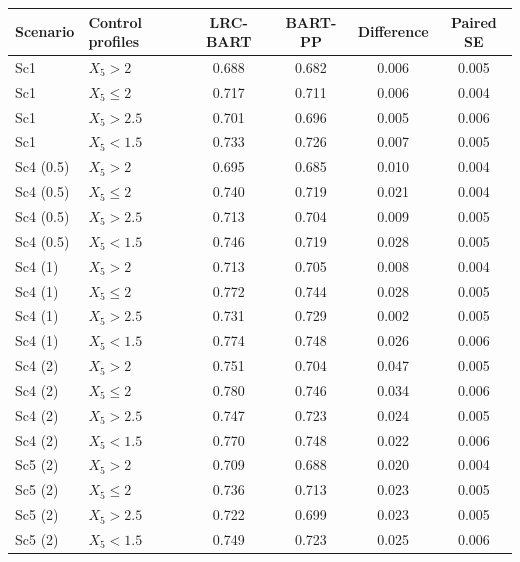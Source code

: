 \begin{center}\scriptsize
\begin{tabular}{llcccc}
\toprule
Scenario & Control profiles & LRC-BART & BART-PP & Difference & Paired SE \\
\midrule
Sc1 & $X_5>2$ & 0.688 & 0.682 & 0.006 & 0.005 \\
Sc1 & $X_5\le2$ & 0.717 & 0.711 & 0.006 & 0.004 \\
Sc1 & $X_5>2.5$ & 0.701 & 0.696 & 0.005 & 0.006 \\
Sc1 & $X_5<1.5$ & 0.733 & 0.726 & 0.007 & 0.005 \\
Sc4 (0.5) & $X_5>2$ & 0.695 & 0.685 & 0.010 & 0.004 \\
Sc4 (0.5) & $X_5\le2$ & 0.740 & 0.719 & 0.021 & 0.004 \\
Sc4 (0.5) & $X_5>2.5$ & 0.713 & 0.704 & 0.009 & 0.005 \\
Sc4 (0.5) & $X_5<1.5$ & 0.746 & 0.719 & 0.028 & 0.005 \\
Sc4 (1) & $X_5>2$ & 0.713 & 0.705 & 0.008 & 0.004 \\
Sc4 (1) & $X_5\le2$ & 0.772 & 0.744 & 0.028 & 0.005 \\
Sc4 (1) & $X_5>2.5$ & 0.731 & 0.729 & 0.002 & 0.005 \\
Sc4 (1) & $X_5<1.5$ & 0.774 & 0.748 & 0.026 & 0.006 \\
Sc4 (2) & $X_5>2$ & 0.751 & 0.704 & 0.047 & 0.005 \\
Sc4 (2) & $X_5\le2$ & 0.780 & 0.746 & 0.034 & 0.006 \\
Sc4 (2) & $X_5>2.5$ & 0.747 & 0.723 & 0.024 & 0.005 \\
Sc4 (2) & $X_5<1.5$ & 0.770 & 0.748 & 0.022 & 0.006 \\
Sc5 (2) & $X_5>2$ & 0.709 & 0.688 & 0.020 & 0.004 \\
Sc5 (2) & $X_5\le2$ & 0.736 & 0.713 & 0.023 & 0.005 \\
Sc5 (2) & $X_5>2.5$ & 0.722 & 0.699 & 0.023 & 0.005 \\
Sc5 (2) & $X_5<1.5$ & 0.749 & 0.723 & 0.025 & 0.006 \\
\bottomrule
\end{tabular}
\end{center}
